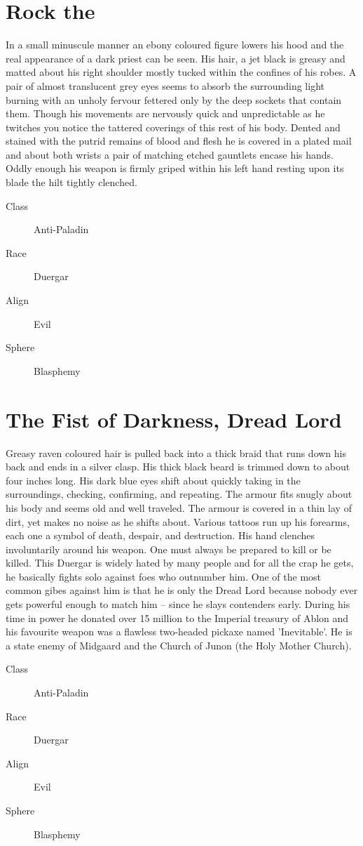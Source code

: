 \begin{multicols}{2}
\section{Rock the }
In a small minuscule manner an ebony coloured figure lowers his hood and the real appearance of a dark priest can be seen. His hair, a jet black is greasy and matted about his right shoulder mostly tucked within the confines of his robes. A pair of almost translucent grey eyes seems to absorb the surrounding light burning with an unholy fervour fettered only by the deep sockets that contain them. Though his movements are nervously quick and unpredictable as he twitches you notice the tattered coverings of this rest of his body. Dented and stained with the putrid remains of blood and flesh he is covered in a plated mail and about both wrists a pair of matching etched gauntlets encase his hands. Oddly enough his weapon is firmly griped within his left hand resting upon its blade the hilt tightly clenched.
\begin{description}
  \item[Class] Anti-Paladin
  \item[Race] Duergar
  \item[Align] Evil
  \item[Sphere] Blasphemy
\end{description}
\section{The Fist of Darkness, Dread Lord}
	Greasy raven coloured hair is pulled back into a thick braid that runs down his back and ends in a silver clasp. His thick black beard is trimmed down to about four inches long. His dark blue eyes shift about quickly taking in the surroundings, checking, confirming, and repeating. The armour fits snugly about his body and seems old and well traveled. The armour is covered in a thin lay of dirt, yet makes no noise as he shifts about. Various tattoos run up his forearms, each one a symbol of death, despair, and destruction. His hand clenches involuntarily around his weapon. One must always be prepared to kill or be killed.
	This Duergar is widely hated by many people and for all the crap he gets, he basically fights solo against foes who outnumber him. One of the most common gibes against him is that he is only the Dread Lord because nobody ever gets powerful enough to match him – since he slays contenders early. During his time in power he donated over 15 million to the Imperial treasury of Ablon and his favourite weapon was a flawless two-headed pickaxe named 'Inevitable'. He is a state enemy of Midgaard and the Church of Junon (the Holy Mother Church). 
\begin{description}
  \item[Class] Anti-Paladin
  \item[Race] Duergar
  \item[Align] Evil
  \item[Sphere] Blasphemy
\end{description}


\end{multicols}
